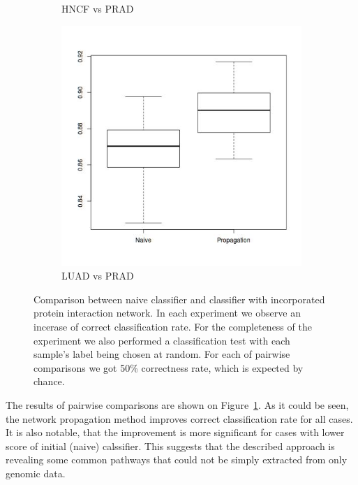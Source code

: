 \documentclass[a4paper]{article}
\begin{document}
\begin{figure} [h]
\begin{subfigure}[b]{0.45\textwidth}
	\caption{HNCF vs PRAD}
\end{subfigure}
\begin{subfigure}[b]{0.45\textwidth}
	\includegraphics[width=\textwidth]{figures/LUAD_PRAD.jpg}
	\caption{LUAD vs PRAD}
\end{subfigure}
\caption{Comparison between naive classifier and classifier with incorporated
		 protein interaction network. In each experiment we observe an incerase
		 of correct classification rate.
		 For the completeness of the experiment
		 we also performed a classification test with each sample's label 
		 being chosen at random. For each of pairwise comparisons we got 50\% correctness
		 rate, which is expected by chance.}
\label{fig:2-way}
\end{figure}

The results of pairwise comparisons are shown on Figure~\ref{fig:2-way}. As it could
be seen, the network propagation method improves correct classification rate 
for all cases. It is also notable, that the improvement is more significant 
for cases with lower score of initial (naive) calssifier. This suggests that
the described approach is revealing some common pathways that could
not be simply extracted from only genomic data. 
\end{document}
